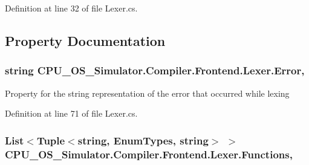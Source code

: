 Definition at line 32 of file Lexer.\+cs.



\subsection{Property Documentation}
\hypertarget{class_c_p_u___o_s___simulator_1_1_compiler_1_1_frontend_1_1_lexer_a0e9d13cd92a7b359a8857e940f0af767}{}
\subsubsection[{Error}]{\setlength{\rightskip}{0pt plus 5cm}string C\+P\+U\+\_\+\+O\+S\+\_\+\+Simulator.\+Compiler.\+Frontend.\+Lexer.\+Error\hspace{0.3cm}{\ttfamily [get]}, {\ttfamily [set]}}\label{class_c_p_u___o_s___simulator_1_1_compiler_1_1_frontend_1_1_lexer_a0e9d13cd92a7b359a8857e940f0af767}


Property for the string representation of the error that occurred while lexing 



Definition at line 71 of file Lexer.\+cs.

\hypertarget{class_c_p_u___o_s___simulator_1_1_compiler_1_1_frontend_1_1_lexer_ac414167d172802ee774d998b1c20b2dd}{}
\subsubsection[{Functions}]{\setlength{\rightskip}{0pt plus 5cm}List$<$Tuple$<$string, {\bf Enum\+Types}, string$>$ $>$ C\+P\+U\+\_\+\+O\+S\+\_\+\+Simulator.\+Compiler.\+Frontend.\+Lexer.\+Functions\hspace{0.3cm}{\ttfamily [get]}, {\ttfamily [set]}}\label{class_c_p_u___o_s___simulator_1_1_compiler_1_1_frontend_1_1_lexer_ac414167d172802ee774d998b1c20b2dd}


